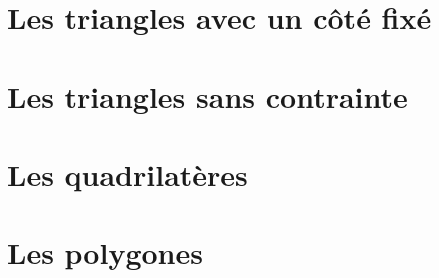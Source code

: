 \documentclass[12pt]{amsart}
\begin{document}


\section{Les triangles avec un côté fixé}






\section{Les triangles sans contrainte}






\section{Les quadrilatères}






\section{Les polygones}


\end{document}
